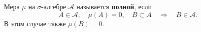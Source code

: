 \label{definition:15}

\begin{definition}
Мера $\mu$ на $\sigma$-алгебре $\mathcal A$ называется \textbf{полной}, если
\[
  A\in\mathcal A,\quad\mu(A)=0,\quad B\subset A
  \quad\Longrightarrow\quad B\in\mathcal A.
\]
В этом случае также $\mu(B)=0$.
\end{definition}
